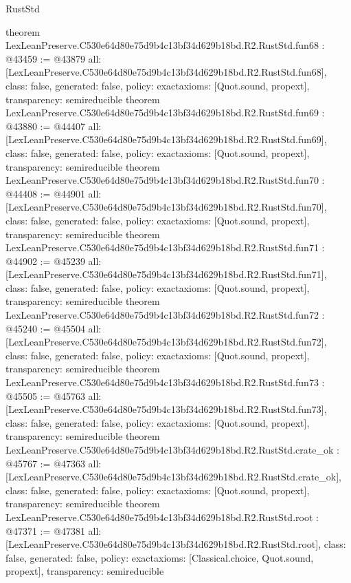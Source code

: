 \begin{lexlean}{RustStd}
\begin{coremodule}
{}
theorem LexLeanPreserve.C530e64d80e75d9b4c13bf34d629b18bd.R2.RustStd.fun68 : @43459 := @43879 {
  all: [LexLeanPreserve.C530e64d80e75d9b4c13bf34d629b18bd.R2.RustStd.fun68],
  class: false,
  generated: false,
  policy: exact{axioms: [Quot.sound, propext]},
  transparency: semireducible
}
theorem LexLeanPreserve.C530e64d80e75d9b4c13bf34d629b18bd.R2.RustStd.fun69 : @43880 := @44407 {
  all: [LexLeanPreserve.C530e64d80e75d9b4c13bf34d629b18bd.R2.RustStd.fun69],
  class: false,
  generated: false,
  policy: exact{axioms: [Quot.sound, propext]},
  transparency: semireducible
}
theorem LexLeanPreserve.C530e64d80e75d9b4c13bf34d629b18bd.R2.RustStd.fun70 : @44408 := @44901 {
  all: [LexLeanPreserve.C530e64d80e75d9b4c13bf34d629b18bd.R2.RustStd.fun70],
  class: false,
  generated: false,
  policy: exact{axioms: [Quot.sound, propext]},
  transparency: semireducible
}
theorem LexLeanPreserve.C530e64d80e75d9b4c13bf34d629b18bd.R2.RustStd.fun71 : @44902 := @45239 {
  all: [LexLeanPreserve.C530e64d80e75d9b4c13bf34d629b18bd.R2.RustStd.fun71],
  class: false,
  generated: false,
  policy: exact{axioms: [Quot.sound, propext]},
  transparency: semireducible
}
theorem LexLeanPreserve.C530e64d80e75d9b4c13bf34d629b18bd.R2.RustStd.fun72 : @45240 := @45504 {
  all: [LexLeanPreserve.C530e64d80e75d9b4c13bf34d629b18bd.R2.RustStd.fun72],
  class: false,
  generated: false,
  policy: exact{axioms: [Quot.sound, propext]},
  transparency: semireducible
}
theorem LexLeanPreserve.C530e64d80e75d9b4c13bf34d629b18bd.R2.RustStd.fun73 : @45505 := @45763 {
  all: [LexLeanPreserve.C530e64d80e75d9b4c13bf34d629b18bd.R2.RustStd.fun73],
  class: false,
  generated: false,
  policy: exact{axioms: [Quot.sound, propext]},
  transparency: semireducible
}
theorem LexLeanPreserve.C530e64d80e75d9b4c13bf34d629b18bd.R2.RustStd.crate_ok : @45767 := @47363 {
  all: [LexLeanPreserve.C530e64d80e75d9b4c13bf34d629b18bd.R2.RustStd.crate_ok],
  class: false,
  generated: false,
  policy: exact{axioms: [Quot.sound, propext]},
  transparency: semireducible
}
theorem LexLeanPreserve.C530e64d80e75d9b4c13bf34d629b18bd.R2.RustStd.root : @47371 := @47381 {
  all: [LexLeanPreserve.C530e64d80e75d9b4c13bf34d629b18bd.R2.RustStd.root],
  class: false,
  generated: false,
  policy: exact{axioms: [Classical.choice, Quot.sound, propext]},
  transparency: semireducible
}


\end{coremodule}
\end{lexlean}
